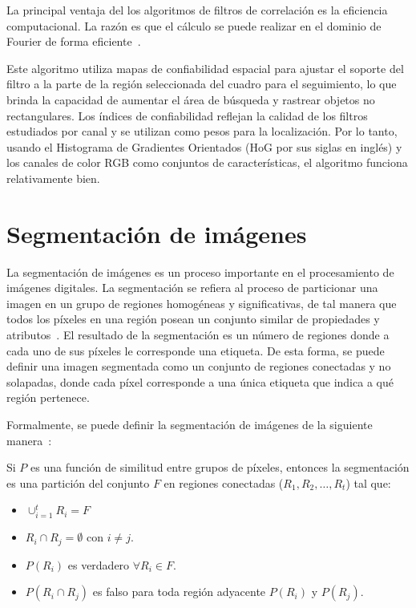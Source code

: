 La principal ventaja del los algoritmos de filtros de correlación es la eficiencia computacional. La razón es que el cálculo se puede realizar en el dominio de Fourier de forma eficiente~\cite{henriques2014high}. 

Este algoritmo utiliza mapas de confiabilidad espacial para ajustar el soporte del filtro a la parte de la región seleccionada del cuadro para el seguimiento, lo que brinda la capacidad de aumentar el área de búsqueda y rastrear objetos no rectangulares. Los índices de confiabilidad reflejan la calidad de los filtros estudiados por canal y se utilizan como pesos para la localización. Por lo tanto, usando el Histograma de Gradientes Orientados (HoG por sus siglas en inglés) y los canales de color RGB como conjuntos de características, el algoritmo funciona relativamente bien.


\section{Segmentación de imágenes}\label{section:seg}

La segmentación de imágenes es un proceso importante en el procesamiento de imágenes digitales. La segmentación se refiera al proceso de particionar una imagen en un grupo de regiones homogéneas y significativas, de tal manera que todos los píxeles en una región posean un conjunto similar de propiedades y atributos~\cite{sundararajan2017digital}. El resultado de la segmentación es un número de regiones donde a cada uno de sus píxeles le corresponde una etiqueta. De esta forma, se puede definir una imagen segmentada como un conjunto de regiones conectadas y no solapadas, donde cada píxel corresponde a una única etiqueta que indica a qué región pertenece.

Formalmente, se puede definir la segmentación de imágenes de la siguiente manera~\cite{pal1993review}:

\begin{definition}
	Si $P$ es una función de similitud entre grupos de píxeles, entonces la segmentación es una partición del conjunto $F$ en regiones conectadas ($R_1, R_2, \ldots, R_t$) tal que:
		\begin{itemize}
			\item $\cup_{i=1}^t R_i = F$
			\item $R_i \cap R_j = \emptyset$ con $i \neq j$.
			\item $P(R_i)$ es verdadero $\forall R_i \in F$.
			\item $P(R_i \cap R_j)$ es falso para toda región adyacente $P(R_i)$ y $P(R_j)$.
		\end{itemize}
\end{definition}

